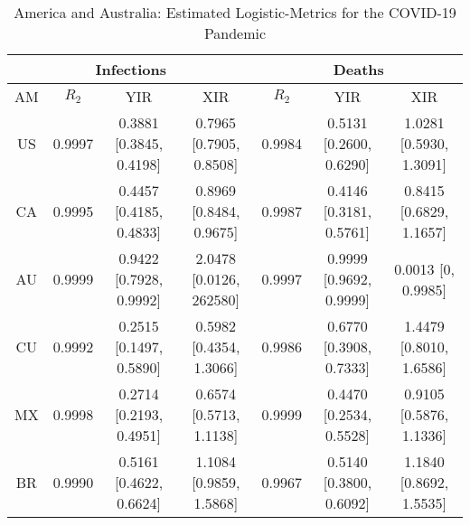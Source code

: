 \documentclass[journal]{IEEEtran}
\theoremstyle{plain}
\theoremstyle{definition}
\theoremstyle{remark}
\begin{document}
\begin{table*}[t]
	\caption{America and Australia: Estimated Logistic-Metrics for the COVID-19 Pandemic}
	\centering
	\def\arraystretch{1.5}\begin{tabular}{|c|c|c|c|c|c|c|}
	\hline
	\multicolumn{4}{|c||}{Infections}&
	\multicolumn{3}{c|}{Deaths}\\
	\hline\hline
	AM & $R_2$ & YIR & XIR & $R_2$ & YIR & XIR \\
	\hline\hline
	US&  0.9997		
	&  0.3881 [0.3845, 0.4198]&  0.7965 [0.7905, 0.8508]& 0.9984& 0.5131	[0.2600, 0.6290] & 1.0281	[0.5930, 1.3091] \\
	\hline
	CA&  0.9995		
	&  0.4457 [0.4185, 0.4833]&  0.8969 [0.8484, 0.9675]&  0.9987&  0.4146	[0.3181, 0.5761]& 0.8415 [0.6829, 1.1657]\\
	\hline
	AU&  0.9999	
	& 0.9422 [0.7928, 0.9992]&  2.0478 [0.0126, 262580]&  0.9997		
	& 0.9999 [0.9692, 0.9999]& 0.0013 [0, 0.9985]\\
	\hline
	CU&  0.9992	
	&  0.2515 [0.1497, 0.5890]&  0.5982 [0.4354, 1.3066]&  0.9986 &  0.6770 [0.3908, 0.7333]& 1.4479	[0.8010, 1.6586]  \\
	\hline
	MX&  0.9998	
	&  0.2714 [0.2193, 0.4951]&  0.6574 [0.5713, 1.1138]& 0.9999&  0.4470	[0.2534, 0.5528]& 0.9105 [0.5876, 1.1336] \\
	\hline
	BR& 0.9990		
	 &  0.5161 [0.4622, 0.6624]&  1.1084 [0.9859, 1.5868]& 0.9967		
	  & 0.5140 [0.3800, 0.6092] & 1.1840 [0.8692, 1.5535] \\
	\hline
\end{tabular}
\label{table_amau}
\end{table*}
\end{document}
